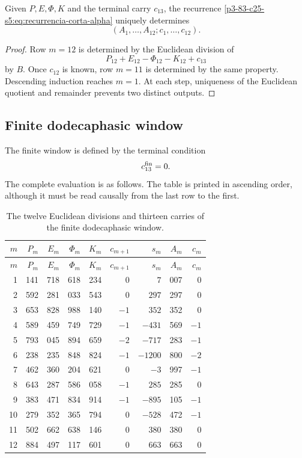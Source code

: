 \begin{theorem}
\label{p3-83-c25-s5:thm:unicidad-acarreo-orientado-alpha}
Given \(P,E,\Phi,K\) and the terminal carry \(c_{13}\), the recurrence
\eqref{p3-83-c25-s5:eq:recurrencia-corta-alpha} uniquely determines
\[
 (A_1,\ldots,A_{12};c_1,\ldots,c_{12}).
\]
\end{theorem}

\begin{proof}
Row \(m=12\) is determined by the Euclidean division of
\[
 P_{12}+E_{12}-\Phi_{12}-K_{12}+c_{13}
\]
by \(B\). Once \(c_{12}\) is known, row \(m=11\) is determined by
the same property. Descending induction reaches \(m=1\). At each
step, uniqueness of the Euclidean quotient and remainder prevents two distinct
outputs.
\end{proof}

\subsection{Finite dodecaphasic window}

The finite window is defined by the terminal condition
\[
 c_{13}^{\rm fin}=0.
\]
The complete evaluation is as follows. The table is printed in ascending
order, although it must be read causally from the last row to the
first.

\begingroup
\scriptsize
\setlength{\tabcolsep}{3.2pt}
\begin{longtable}{@{}r|rrrr|r|r|r|r@{}}
\caption{The twelve Euclidean divisions and thirteen carries of the finite
dodecaphasic window.}
\label{p3-83-c25-s5:tab:acarreo-alpha-finito-autonomo}\\
\toprule
\(m\)&\(P_m\)&\(E_m\)&\(\Phi_m\)&\(K_m\)&
\(c_{m+1}\)&\(s_m\)&\(A_m\)&\(c_m\)\\
\midrule
\endfirsthead
\toprule
\(m\)&\(P_m\)&\(E_m\)&\(\Phi_m\)&\(K_m\)&
\(c_{m+1}\)&\(s_m\)&\(A_m\)&\(c_m\)\\
\midrule
\endhead
1  &141&718&618&234& \(0\)& \(7\)&007& \(0\)\\
2  &592&281&033&543& \(0\)& \(297\)&297& \(0\)\\
3  &653&828&988&140& \(-1\)& \(352\)&352& \(0\)\\
4  &589&459&749&729& \(-1\)& \(-431\)&569& \(-1\)\\
5  &793&045&894&659& \(-2\)& \(-717\)&283& \(-1\)\\
6  &238&235&848&824& \(-1\)& \(-1200\)&800& \(-2\)\\
7  &462&360&204&621& \(0\)& \(-3\)&997& \(-1\)\\
8  &643&287&586&058& \(-1\)& \(285\)&285& \(0\)\\
9  &383&471&834&914& \(-1\)& \(-895\)&105& \(-1\)\\
10 &279&352&365&794& \(0\)& \(-528\)&472& \(-1\)\\
11 &502&662&638&146& \(0\)& \(380\)&380& \(0\)\\
12 &884&497&117&601& \(0\)& \(663\)&663& \(0\)\\
\bottomrule
\end{longtable}
\endgroup

